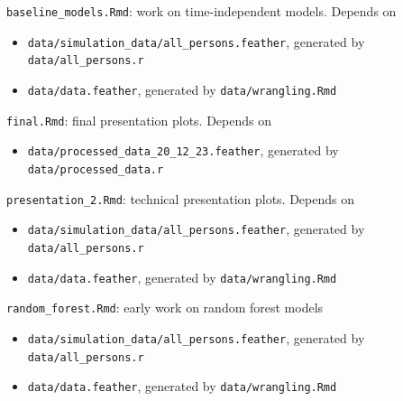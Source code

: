 \documentclass[
]{article}
\providecommand{\tightlist}{%
  \setlength{\itemsep}{0pt}\setlength{\parskip}{0pt}}
\begin{document}
\texttt{baseline\_models.Rmd}: work on time-independent models. Depends
on

\begin{itemize}
\tightlist
\item
  \texttt{data/simulation\_data/all\_persons.feather}, generated by
  \texttt{data/all\_persons.r}
\item
  \texttt{data/data.feather}, generated by \texttt{data/wrangling.Rmd}
\end{itemize}

\texttt{final.Rmd}: final presentation plots. Depends on

\begin{itemize}
\tightlist
\item
  \texttt{data/processed\_data\_20\_12\_23.feather}, generated by
  \texttt{data/processed\_data.r}
\end{itemize}

\texttt{presentation\_2.Rmd}: technical presentation plots. Depends on

\begin{itemize}
\tightlist
\item
  \texttt{data/simulation\_data/all\_persons.feather}, generated by
  \texttt{data/all\_persons.r}
\item
  \texttt{data/data.feather}, generated by \texttt{data/wrangling.Rmd}
\end{itemize}

\texttt{random\_forest.Rmd}: early work on random forest models

\begin{itemize}
\tightlist
\item
  \texttt{data/simulation\_data/all\_persons.feather}, generated by
  \texttt{data/all\_persons.r}
\item
  \texttt{data/data.feather}, generated by \texttt{data/wrangling.Rmd}
\end{itemize}
\end{document}
